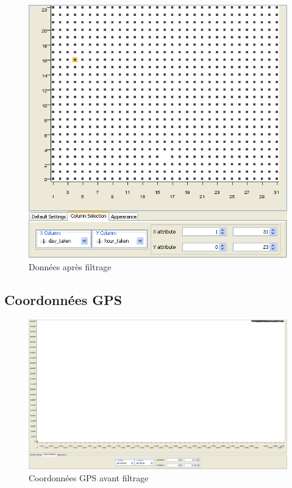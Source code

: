         \begin{figure}[h]
            \centering
            \includegraphics[scale=0.35]{../screenshots/day_hour_after.png}
            \caption{Donn\'ees apr\`es filtrage}
            \label{diagram:day_hour_after}
        \end{figure}

    \pagebreak
    \subsection{Coordonn\'ees GPS}
        \begin{figure}[h]
            \centering
            \includegraphics[scale=0.22]{../screenshots/geographic_before.png}
            \caption{Coordonn\'ees GPS avant filtrage}
            \label{diagram:geographic_before}
        \end{figure}

